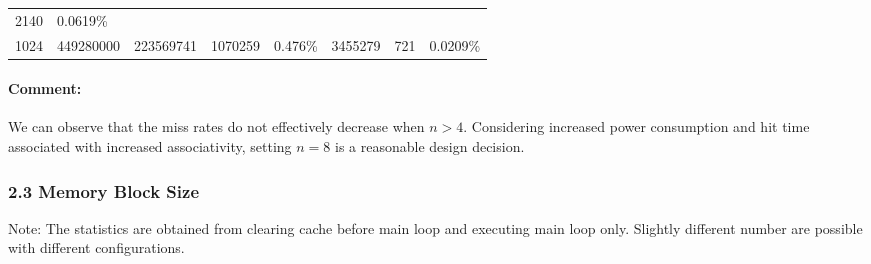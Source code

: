 \documentclass[11pt]{article}
\begin{document}
\begin{longtable}[]{@{}llllllll@{}}
\begin{minipage}[t]{0.10\columnwidth}
2140\strut
\end{minipage} & \begin{minipage}[t]{0.10\columnwidth}\raggedright\strut
0.0619\%\strut
\end{minipage}\tabularnewline
\begin{minipage}[t]{0.14\columnwidth}\raggedright\strut
1024\strut
\end{minipage} & \begin{minipage}[t]{0.10\columnwidth}\raggedright\strut
449280000\strut
\end{minipage} & \begin{minipage}[t]{0.08\columnwidth}\raggedright\strut
223569741\strut
\end{minipage} & \begin{minipage}[t]{0.09\columnwidth}\raggedright\strut
1070259\strut
\end{minipage} & \begin{minipage}[t]{0.09\columnwidth}\raggedright\strut
0.476\%\strut
\end{minipage} & \begin{minipage}[t]{0.08\columnwidth}\raggedright\strut
3455279\strut
\end{minipage} & \begin{minipage}[t]{0.10\columnwidth}\raggedright\strut
721\strut
\end{minipage} & \begin{minipage}[t]{0.10\columnwidth}\raggedright\strut
0.0209\%\strut
\end{minipage}\tabularnewline
\bottomrule
\end{longtable}

\paragraph{Comment:}\label{comment}

We can observe that the miss rates do not effectively decrease when
\(n>4\). Considering increased power consumption and hit time associated
with increased associativity, setting \(n=8\) is a reasonable design
decision.

    \subsubsection{2.3 Memory Block Size}\label{memory-block-size}

Note: The statistics are obtained from clearing cache before main loop
and executing main loop only. Slightly different number are possible
with different configurations.
\end{document}
